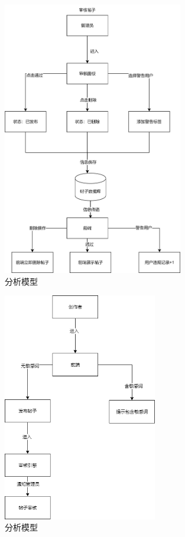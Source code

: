 \documentclass{base}
\numberwithin{figure}{section} %
\begin{document}
\begin{figure}[H]
    \centering
    \includegraphics[width=0.7\textwidth]{images/4-2.png}
    \caption{分析模型}
\end{figure}
\begin{figure}[H]
    \centering
    \includegraphics[width=0.6\textwidth]{images/4-3.png}
    \caption{分析模型}
\end{figure}
\end{document}
